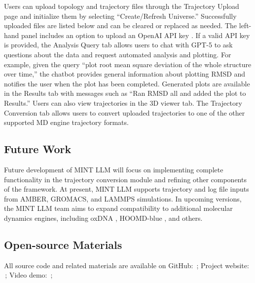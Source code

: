 Users can upload topology and trajectory files through the Trajectory Upload page and initialize them by selecting “Create/Refresh Universe.” Successfully uploaded files are listed below and can be cleared or replaced as needed. The left-hand panel includes an option to upload an OpenAI API key \cite{OpenAI_API}. If a valid API key is provided, the Analysis Query tab allows users to chat with GPT-5 to ask questions about the data and request automated analysis and plotting. For example, given the query “plot root mean square deviation of the whole structure over time,” the chatbot provides general information about plotting RMSD and notifies the user when the plot has been completed. Generated plots are available in the Results tab with messages such as “Ran RMSD all and added the plot to Results.” Users can also view trajectories in the 3D viewer tab. The Trajectory Conversion tab allows users to convert uploaded trajectories to one of the other supported MD engine trajectory formats.

\subsection*{Future Work}
Future development of MINT LLM will focus on implementing complete functionality in the trajectory conversion module and refining other components of the framework. At present, MINT LLM supports trajectory and log file inputs from AMBER, GROMACS, and LAMMPS simulations. In upcoming versions, the MINT LLM team aims to expand compatibility to additional molecular dynamics engines, including oxDNA \cite{poppleton2021oxdna}, HOOMD-blue \cite{anderson2020hoomd}, and others.

\subsection*{Open-source Materials}

All source code and related materials are available on GitHub:
\,; Project website: \,; Video demo: \,;




